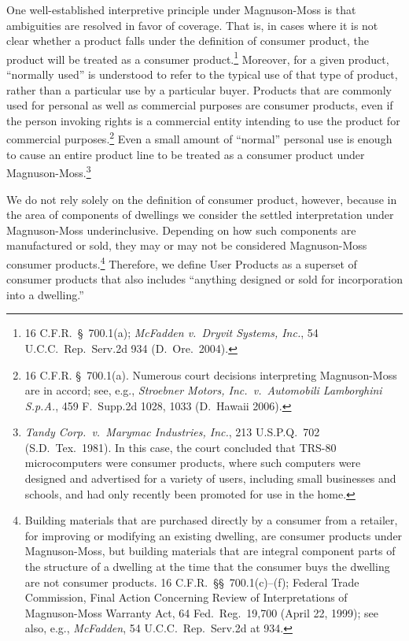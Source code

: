 One well-established interpretive principle under Magnuson-Moss is that
ambiguities are resolved in favor of coverage.  That is, in cases where
it is not clear whether a product falls under the definition of consumer
product, the product will be treated as a consumer product.\footnote{16
C.F.R.~\S\ 700.1(a); \textit{McFadden v.~Dryvit Systems, Inc.}, 54
U.C.C.~Rep.~Serv.2d 934 (D.~Ore.~2004).}  Moreover, for a given product,
``normally used'' is understood to refer to the typical use of that type
of product, rather than a particular use by a particular buyer.
Products that are commonly used for personal as well as commercial
purposes are consumer products, even if the person invoking rights is a
commercial entity intending to use the product for commercial
purposes.\footnote{16 C.F.R. \S \ 700.1(a).  Numerous court decisions
interpreting Magnuson-Moss are in accord; see, e.g., \textit{Stroebner
Motors, Inc.~v.~Automobili Lamborghini S.p.A.}, 459 F.~Supp.2d 1028,
1033 (D.~Hawaii 2006).}  Even a small amount of ``normal'' personal use
is enough to cause an entire product line to be treated as a consumer
product under Magnuson-Moss.\footnote{\textit{Tandy Corp.~v.~Marymac
Industries, Inc.}, 213 U.S.P.Q.~702 (S.D.~Tex.~1981). In this case, the
court concluded that TRS-80 microcomputers were consumer products, where
such computers were designed and advertised for a variety of users,
including small businesses and schools, and had only recently been
promoted for use in the home.}

We do not rely solely on the definition of consumer product, however,
because in the area of components of dwellings we consider the settled
interpretation under Magnuson-Moss underinclusive.  Depending on how
such components are manufactured or sold, they may or may not be
considered Magnuson-Moss consumer products.\footnote{Building materials
that are purchased directly by a consumer from a retailer, for improving
or modifying an existing dwelling, are consumer products under
Magnuson-Moss, but building materials that are integral component parts
of the structure of a dwelling at the time that the consumer buys the
dwelling are not consumer products. 16 C.F.R.~\S\S~700.1(c)--(f);
Federal Trade Commission, Final Action Concerning Review of
Interpretations of Magnuson-Moss Warranty Act, 64 Fed.~Reg.~19,700
(April 22, 1999); see also, e.g., \textit{McFadden}, 54
U.C.C.~Rep.~Serv.2d at 934.}  Therefore, we define User Products as a
superset of consumer products that also includes ``anything designed or
sold for incorporation into a dwelling.''

